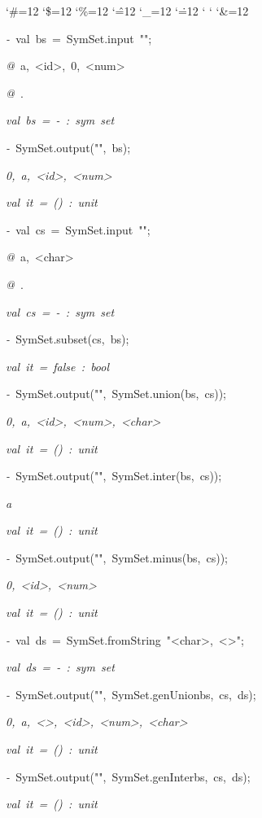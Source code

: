 \begin{list}{}
{\setlength{\leftmargin}{\leftmargini}
\setlength{\rightmargin}{0cm}
\setlength{\itemindent}{0cm}
\setlength{\listparindent}{0cm}
\setlength{\itemsep}{0cm}
\setlength{\parsep}{0cm}
\setlength{\labelsep}{0cm}
\setlength{\labelwidth}{0cm}
\catcode`\#=12
\catcode`\$=12
\catcode`\%=12
\catcode`\^=12
\catcode`\_=12
\catcode`\.=12
\catcode`
\catcode`
\catcode`\&=12
\ttfamily}
\small
\item[]\textsl{-\ }val\ bs\ =\ SymSet.input\ "";
\item[]\textsl{@\ }a,\ <id>,\ 0,\ <num>
\item[]\textsl{@\ }.
\item[]\textsl{val\ bs\ =\ -\ :\ sym\ set}
\item[]\textsl{-\ }SymSet.output("",\ bs);
\item[]\textsl{0,\ a,\ <id>,\ <num>}
\item[]\textsl{val\ it\ =\ ()\ :\ unit}
\item[]\textsl{-\ }val\ cs\ =\ SymSet.input\ "";\ 
\item[]\textsl{@\ }a,\ <char>\ 
\item[]\textsl{@\ }.
\item[]\textsl{val\ cs\ =\ -\ :\ sym\ set}
\item[]\textsl{-\ }SymSet.subset(cs,\ bs);
\item[]\textsl{val\ it\ =\ false\ :\ bool}
\item[]\textsl{-\ }SymSet.output("",\ SymSet.union(bs,\ cs));
\item[]\textsl{0,\ a,\ <id>,\ <num>,\ <char>}
\item[]\textsl{val\ it\ =\ ()\ :\ unit}
\item[]\textsl{-\ }SymSet.output("",\ SymSet.inter(bs,\ cs));
\item[]\textsl{a}
\item[]\textsl{val\ it\ =\ ()\ :\ unit}
\item[]\textsl{-\ }SymSet.output("",\ SymSet.minus(bs,\ cs));
\item[]\textsl{0,\ <id>,\ <num>}
\item[]\textsl{val\ it\ =\ ()\ :\ unit}
\item[]\textsl{-\ }val\ ds\ =\ SymSet.fromString\ "<char>,\ <>";
\item[]\textsl{val\ ds\ =\ -\ :\ sym\ set}
\item[]\textsl{-\ }SymSet.output("",\ SymSet.genUnionbs,\ cs,\ ds);
\item[]\textsl{0,\ a,\ <>,\ <id>,\ <num>,\ <char>}
\item[]\textsl{val\ it\ =\ ()\ :\ unit}
\item[]\textsl{-\ }SymSet.output("",\ SymSet.genInterbs,\ cs,\ ds);
\item[]
\item[]\textsl{val\ it\ =\ ()\ :\ unit}
\end{list}
